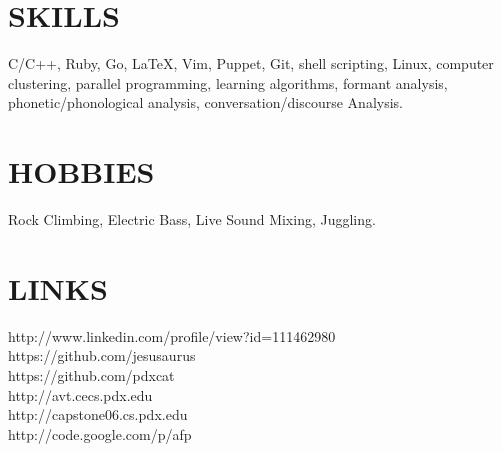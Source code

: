\documentclass[overlapped]{res}
\begin{document}
\begin{resume}
\section{SKILLS} 
\vspace{7pt} 
C/C++, Ruby, Go, LaTeX, Vim, Puppet, Git, shell scripting, Linux, computer clustering, parallel programming, learning algorithms, formant analysis, phonetic/phonological analysis, conversation/discourse Analysis.

\section{HOBBIES} 
\vspace{7pt} 
Rock Climbing, Electric Bass, Live Sound Mixing, Juggling.

\section{LINKS}
\vspace{7pt}
http://www.linkedin.com/profile/view?id=111462980\\
https://github.com/jesusaurus\\
https://github.com/pdxcat\\
http://avt.cecs.pdx.edu\\
http://capstone06.cs.pdx.edu\\
http://code.google.com/p/afp\\

\end{resume}
\end{document}
